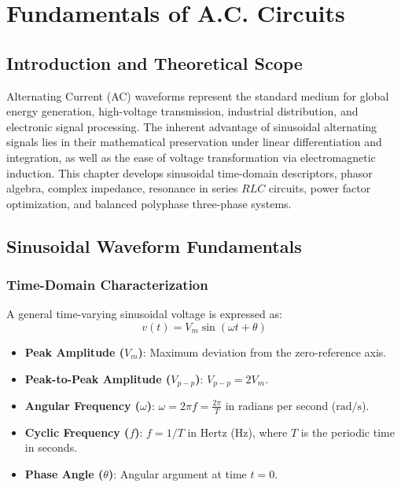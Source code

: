 \chapter{Fundamentals of A.C. Circuits}
\label{chap:ac-circuits}

\section{Introduction and Theoretical Scope}
Alternating Current (AC) waveforms represent the standard medium for global energy generation, high-voltage transmission, industrial distribution, and electronic signal processing. The inherent advantage of sinusoidal alternating signals lies in their mathematical preservation under linear differentiation and integration, as well as the ease of voltage transformation via electromagnetic induction. This chapter develops sinusoidal time-domain descriptors, phasor algebra, complex impedance, resonance in series $RLC$ circuits, power factor optimization, and balanced polyphase three-phase systems.

\section{Sinusoidal Waveform Fundamentals}

\subsection{Time-Domain Characterization}
A general time-varying sinusoidal voltage is expressed as:
\begin{equation}
v(t) = V_m \sin(\omega t + \theta)
\end{equation}
\begin{itemize}[leftmargin=1.5em]
    \item \textbf{Peak Amplitude ($V_m$)}: Maximum deviation from the zero-reference axis.
    \item \textbf{Peak-to-Peak Amplitude ($V_{p-p}$)}: $V_{p-p} = 2 V_m$.
    \item \textbf{Angular Frequency ($\omega$)}: $\omega = 2\pi f = \frac{2\pi}{T}$ in radians per second ($\text{rad/s}$).
    \item \textbf{Cyclic Frequency ($f$)}: $f = 1/T$ in Hertz ($\text{Hz}$), where $T$ is the periodic time in seconds.
    \item \textbf{Phase Angle ($\theta$)}: Angular argument at time $t = 0$.
\end{itemize}

